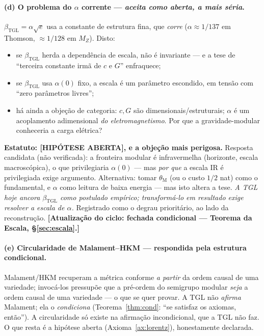 \documentclass[11pt,a4paper]{article}
\newcommand{\ABERTO}{\textsf{[HIPÓTESE ABERTA]}}
\newcommand{\bTGL}{\beta_{\mathrm{TGL}}}
\newcommand{\thM}{\theta_{\mathrm M}}
\begin{document}
\paragraph{(d) O problema do $\alpha$ corrente --- \emph{aceita como aberta,
a mais séria}.}
$\bTGL=\alpha\sqrt e$ usa a constante de estrutura fina, que \emph{corre}
($\alpha\approx1/137$ em Thomson, $\approx1/128$ em $M_Z$). Disto:
\begin{itemize}[noitemsep]
  \item se $\bTGL$ herda a dependência de escala, não é invariante --- e a
  tese de ``terceira constante irmã de $c$ e $G$'' enfraquece;
  \item se $\bTGL$ usa $\alpha(0)$ fixo, a escala é um parâmetro escondido,
  em tensão com ``zero parâmetros livres'';
  \item há ainda a objeção de categoria: $c,G$ são dimensionais/estruturais;
  $\alpha$ é um acoplamento adimensional \emph{do eletromagnetismo}. Por que
  a gravidade-modular conheceria a carga elétrica?
\end{itemize}
\textbf{Estatuto: \ABERTO, e a objeção mais perigosa.} Resposta candidata
(não verificada): a fronteira modular é infravermelha (horizonte, escala
macroscópica), o que privilegiaria $\alpha(0)$ --- mas \emph{por que} a
escala IR é privilegiada exige argumento. Alternativa: tomar $\thM$ (ou o
custo $1/2$ nat) como o fundamental, e $\alpha$ como leitura de baixa
energia --- mas isto altera a tese. \emph{A TGL hoje ancora $\bTGL$ como
postulado empírico; transformá-lo em resultado exige resolver a escala de
$\alpha$.} Registrado como o degrau prioritário, ao lado da reconstrução.
\textbf{[Atualização do ciclo: fechada condicional --- Teorema da Escala,
\S\ref{sec:escala}.]}

\paragraph{(e) Circularidade de Malament--HKM --- respondida pela estrutura
condicional.}
Malament/HKM recuperam a métrica conforme \emph{a partir} da ordem causal de
uma variedade; invocá-los pressupõe que a pré-ordem do semigrupo modular
\emph{seja} a ordem causal de uma variedade --- o que se quer provar. A TGL
não \emph{afirma} Malament; ela o \emph{condiciona} (Teorema~\ref{thm:cond}:
``se satisfaz os axiomas, então''). A circularidade só existe na afirmação
incondicional, que a TGL não faz. O que resta é a hipótese aberta
(Axioma~\ref{ax:lorentz}), honestamente declarada.
\end{document}
